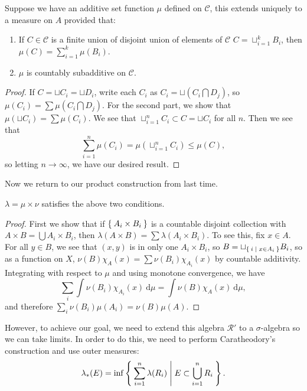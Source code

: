 \documentclass[10pt, twoside]{article}
\renewcommand{\d}{\ \mathrm{d}}
\begin{document}
    \begin{lem} Suppose we have an additive set function $\mu$ defined on
        $\mathcal{C}$, this extends uniquely to a measure on $A$ provided that:

    \begin{enumerate} \item If $C \in \mathcal{C}$ is a finite union of
    disjoint union of elements of $\mathcal{C}$ $C = \sqcup_{i=1}^k B_i$, then
    $\mu(C) = \sum_{i=1}^k \mu(B_i)$.  \item $\mu$ is countably subadditive on
    $\mathcal{C}$.  \end{enumerate} \begin{proof} If $C = \sqcup C_i = \sqcup
    D_i$, write each $C_i$ as $C_i = \sqcup (C_i \bigcap D_j)$, so $\mu(C_i) =
    \sum \mu(C_i \bigcap D_j)$. For the second part, we show that $\mu(\sqcup
    C_i) = \sum \mu(C_i)$. We see that $\sqcup_{i=1}^n C_i \subset C = \sqcup
    C_i$ for all $n$. Then we see that \[\sum_{i=1}^n \mu(C_i) =
    \mu(\sqcup_{i=1}^n C_i) \leq \mu(C),\] so letting $n \rightarrow \infty$,
    we have our desired result.  \end{proof} \end{lem}

    Now we return to our product construction from last time. 

    \begin{lem} $\lambda = \mu \times \nu$ satisfies the above two conditions.
        \begin{proof} First we show that if $\Set{A_i \times B_i}$ is a
            countable disjoint collection with $A \times B = \bigcup A_i \times
            B_i$, then $\lambda(A \times B) = \sum \lambda(A_i \times B_i)$. To
            see this, fix $x \in A$. For all $y \in B$, we see that $(x,y)$ is
            in only one $A_i \times B_i$, so $B = \sqcup_{\Set{i | x \in A_i}}
            B_i$, so as a function on $X$, $\nu(B)\chi_A(x) = \sum \nu(B_i)
            \chi_{A_i}(x)$ by countable additivity. Integrating with respect to
            $\mu$ and using monotone convergence, we have \[ \sum_i \int
            \nu(B_i)\chi_{A_i}(x)\d \mu = \int \nu(B) \chi_A(x) \d \mu, \] and
            therefore $\sum_i \nu(B_i)\mu(A_i) = \nu(B)\mu(A)$.  \end{proof}
        \end{lem}

    However, to achieve our goal, we need to extend this algebra $\mathcal{R'}$
    to a $\sigma$-algebra so we can take limits. In order to do this, we need
    to perform Caratheodory's construction and use outer measures:  \[
    \lambda_*(E) = \inf \Set{\sum_{i=1}^n \lambda(R_i) | E \subset
\bigcup_{i=1}^n R_i}. \]
\end{document}
